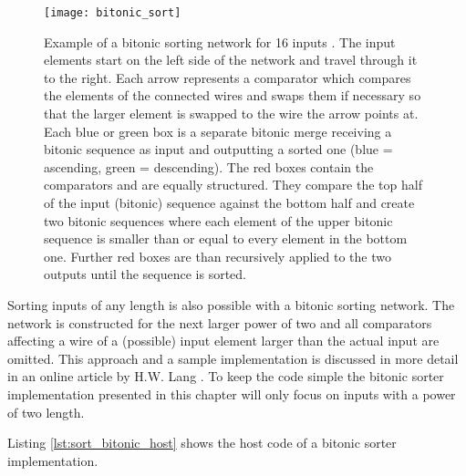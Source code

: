 \begin{figure}
\centering
\texttt{[image: bitonic\_sort]}
\caption{Example of a bitonic sorting network for 16 inputs \cite{wiki_bitonic_sort}. The input elements start on the left side of the network and travel through it to the right. Each arrow represents a comparator which compares the elements of the connected wires and swaps them if necessary so that the larger element is swapped to the wire the arrow points at. Each blue or green box is a separate bitonic merge receiving a bitonic sequence as input and outputting a sorted one (blue = ascending, green = descending). The red boxes contain the comparators and are equally structured. They compare the top half of the input (bitonic) sequence against the bottom half and create two bitonic sequences where each element of the upper bitonic sequence is smaller than or equal to every element in the bottom one. Further red boxes are than recursively applied to the two outputs until the sequence is sorted.}
\label{fig:bitonic_sort}
\end{figure}

Sorting inputs of any length is also possible with a bitonic sorting network. The network is constructed for the next larger power of two and all comparators affecting a wire of a (possible) input element larger than the actual input are omitted. This approach and a sample implementation is discussed in more detail in an online article by H.W. Lang \cite{sort_bitonic_arbitrary_n}. To keep the code simple the bitonic sorter implementation presented in this chapter will only focus on inputs with a power of two length.

Listing \ref{lst:sort_bitonic_host} shows the host code of a bitonic sorter implementation.



